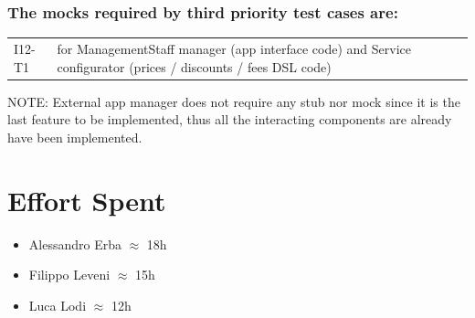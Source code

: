 \documentclass[english]{article}
\begin{document}
\subsubsection*{ The mocks required by third priority test cases are: }

\begin{table}[H]
\begin{tabular}{l | p{12cm}}

I12-T1 & for ManagementStaff manager (app interface code) and Service configurator (prices / discounts / fees DSL code) \\[5px]

\end{tabular}
\end{table}

\par NOTE: External app manager does not require any stub nor mock since it is the last feature to be implemented, thus all the interacting components are already have been implemented.

\clearpage
\section{Effort Spent} %
	\begin{itemize}
		\item Alessandro Erba $\approx$ 18h
		\item Filippo Leveni 	$\approx$ 15h
		\item Luca Lodi $\approx$ 12h
	\end{itemize}
\end{document}

